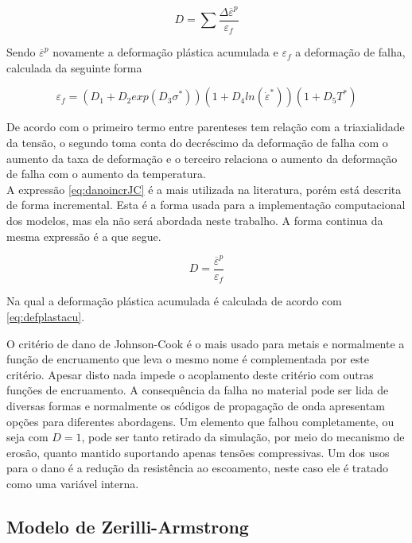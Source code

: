 \begin{equation} \label{eq:danoincrJC}
    D = \sum \frac{\Delta \overline{\varepsilon}^p}{\varepsilon_f}
\end{equation}

Sendo $ \overline{\varepsilon}^p $ novamente a deformação plástica acumulada e $ \varepsilon_f $ a deformação de falha, calculada da seguinte forma

\begin{equation}
    \varepsilon_f = (D_1 + D_2 exp(D_3 \sigma^*))(1 + D_4 ln(\dot{\varepsilon}^*))(1 + D_5 T^*)
\end{equation}

De acordo com \cite{Crouch} o primeiro termo entre parenteses tem relação com a triaxialidade da tensão, o segundo toma conta do decréscimo da deformação de falha com o aumento da taxa de deformação e o terceiro relaciona o aumento da deformação de falha com o aumento da temperatura. \\

A expressão \ref{eq:danoincrJC} é a mais utilizada na literatura, porém está descrita de forma incremental. Esta é a forma usada para a implementação computacional dos modelos, mas ela não será abordada neste trabalho. A forma continua da mesma expressão é a que segue.

\begin{equation}
    D = \frac{\overline{\varepsilon}^p}{\varepsilon_f}
\end{equation}

Na qual a deformação plástica acumulada é calculada de acordo com \ref{eq:defplastacu}.

O critério de dano de Johnson-Cook é o mais usado para metais e normalmente a função de encruamento que leva o mesmo nome é complementada por este critério. Apesar disto nada impede o acoplamento deste critério com outras funções de encruamento. A consequência da falha no material pode ser lida de diversas formas e normalmente os códigos de propagação de onda apresentam opções para diferentes abordagens. Um elemento que falhou completamente, ou seja com $ D = 1  $, pode ser tanto retirado da simulação, por meio do mecanismo de erosão, quanto mantido suportando apenas tensões compressivas. Um dos usos para o dano é a redução da resistência ao escoamento, neste caso ele é tratado como uma variável interna.

\subsection{Modelo de Zerilli-Armstrong}
 
